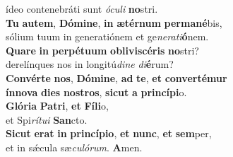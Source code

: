 \evenverse ídeo contenebráti sunt \textit{ó}\textit{cu}\textit{li} \textbf{no}stri.\\
\oddverse \textbf{Tu} \textbf{au}\textbf{tem}, \textbf{Dó}\textbf{mi}\textbf{ne}, \textbf{in} \textbf{æ}\textbf{tér}\textbf{num} \textbf{per}\textbf{ma}\textbf{né}bis,~\*\\
\oddverse sólium tuum in generatiónem et ge\textit{ne}\textit{ra}\textit{ti}\textbf{ó}nem.\\
\evenverse \textbf{Qua}\textbf{re} \textbf{in} \textbf{per}\textbf{pé}\textbf{tu}\textbf{um} \textbf{o}\textbf{bli}\textbf{vi}\textbf{scé}\textbf{ris} \textbf{no}stri?~\*\\
\evenverse derelínques nos in longitú\textit{di}\textit{ne} \textit{di}\textbf{é}rum?\\
\oddverse \textbf{Con}\textbf{vér}\textbf{te} \textbf{nos}, \textbf{Dó}\textbf{mi}\textbf{ne}, \textbf{ad} \textbf{te}, \textbf{et} \textbf{con}\textbf{ver}\textbf{té}\textbf{mur}~\*\\
\oddverse \textbf{ín}\textbf{no}\textbf{va} \textbf{di}\textbf{es} \textbf{no}\textbf{stros}, \textbf{si}\textbf{cut} \textbf{a} \textbf{prin}\textbf{cí}\textbf{pi}o.\\
\evenverse \textbf{Gló}\textbf{ri}\textbf{a} \textbf{Pa}\textbf{tri}, \textbf{et} \textbf{Fí}\textbf{li}o,~\*\\
\evenverse et Spi\textit{rí}\textit{tu}\textit{i} \textbf{San}cto.\\
\oddverse \textbf{Si}\textbf{cut} \textbf{e}\textbf{rat} \textbf{in} \textbf{prin}\textbf{cí}\textbf{pi}\textbf{o}, \textbf{et} \textbf{nunc}, \textbf{et} \textbf{sem}per,~\*\\
\oddverse et in sǽcula sæ\textit{cu}\textit{ló}\textit{rum}. \textbf{A}men.\\
